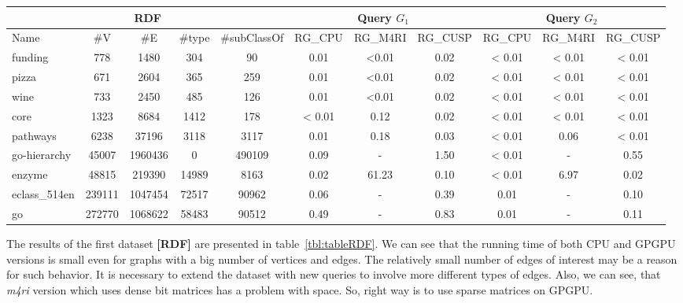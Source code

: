 {\setlength{\tabcolsep}{0.4em}
\begin{table*}
\caption{RDFs querying results}
\label{tbl:tableRDF}
\begin{tabular}{| p{1.5cm} | c | c |c | c | c | c | c | c | c | c |}
    \hline
    \multicolumn{5}{|c|}{RDF}        & \multicolumn{3}{|c|}{Query $G_1$}                               & \multicolumn{3}{|c|}{Query $G_2$} \\
    \hline
    Name                  & \#V    & \#E     & \#type &\#subClassOf & RG\_CPU & RG\_M4RI  & RG\_CUSP   & RG\_CPU & RG\_M4RI  & RG\_CUSP \\
    \hline
    \hline
    \small{funding}       & 778    & 1480    & 304   & 90           & 0.01      & <0.01   & 0.02       & < 0.01  & < 0.01    & < 0.01    \\
    \small{pizza}         & 671    & 2604    & 365   & 259          & 0.01      & <0.01   & 0.02       & < 0.01  & < 0.01    & < 0.01    \\
    \small{wine}          & 733    & 2450    & 485   & 126          & 0.01      & <0.01   & 0.02       & < 0.01  & < 0.01    & < 0.01    \\
    \small{core}          & 1323   & 8684    & 1412  & 178          & < 0.01    & 0.12    & 0.02       & < 0.01  & < 0.01    & < 0.01    \\
    \small{pathways}      & 6238   & 37196   & 3118  & 3117         & 0.01      & 0.18    & 0.03       & < 0.01  & 0.06      & < 0.01    \\
    \small{go-hierarchy}  & 45007  & 1960436 & 0     & 490109       & 0.09      & -       & 1.50       & < 0.01  & -         & 0.55      \\
    \small{enzyme}        & 48815  & 219390  & 14989 & 8163         & 0.02      & 61.23   & 0.10       & < 0.01  & 6.97      & 0.02      \\
    \small{eclass\_514en} & 239111 & 1047454 & 72517 & 90962        & 0.06      & -       & 0.39       & 0.01    & -         & 0.10      \\
    \small{go}            & 272770 & 1068622 & 58483 & 90512        & 0.49      & -       & 0.83       & 0.01    & -         & 0.11      \\
    \hline
  \end{tabular}
\end{table*}
}


The results of the first dataset \textbf{[RDF]} are presented in table~\ref{tbl:tableRDF}.
We can see that the running time of both CPU and GPGPU versions is small even for graphs with a big number of vertices and edges.
The relatively small number of edges of interest may be a reason for such behavior.
It is necessary to extend the dataset with new queries to involve more different types of edges.
Also, we can see, that \textit{m4ri} version which uses dense bit matrices has a problem with space.
So, right way is to use sparse matrices on GPGPU.

